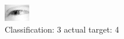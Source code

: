 \begin{figure}[h!]
\begin{center}
\includegraphics[width=0.60\columnwidth]{figures/ID2450_class_3_target_4.png}
\end{center}
\caption{ Classification: 3 actual target: 4}
\label{fig:ID2450_class_3_target_4}
\end{figure}
